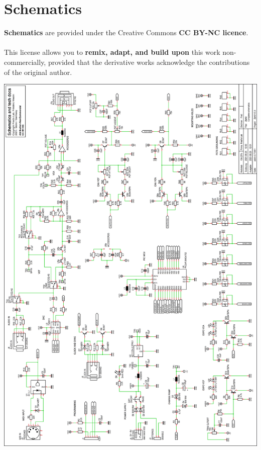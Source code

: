 \documentclass{scrartcl}
\begin{document}
\section{Schematics}
\textbf{Schematics} are provided under the Creative Commons \textbf{CC BY-NC licence}.\\\\
This license allows you to \textbf{remix, adapt, and build upon} this work non-commercially, provided that the derivative works acknowledge the contributions of the original author. 
\vspace{0.25cm}
\begin{center}
    \includegraphics[scale=0.72,origin=c]{assets/schema-full.png}
\end{center}
\end{document}
